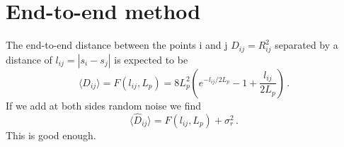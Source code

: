 \documentclass[twocolumn,aps,prxlife,longbibliography,amsmath,amssymb,floatfix,superscriptaddress,showkeys]{revtex4-2}
\begin{document}
\section{End-to-end method}
The end-to-end distance between the points i and j $D_{ij}=R_{ij}^2$ separated by a distance of $l_{ij}=|s_i - s_j|$ is expected to be
\begin{equation}
  \langle D_{ij} \rangle = F(l_{ij}, L_p) = 8 L_p^2 \left( e^{-l_{ij}/2L_p} - 1 + \frac{l_{ij}}{2L_p} \right) \, .
\end{equation}
If we add at both sides random noise we find
\begin{equation}
  \langle \hat{D}_{ij} \rangle = F(l_{ij}, L_p) + \sigma_r^2 \,.
\end{equation}
This is good enough.


\end{document}
